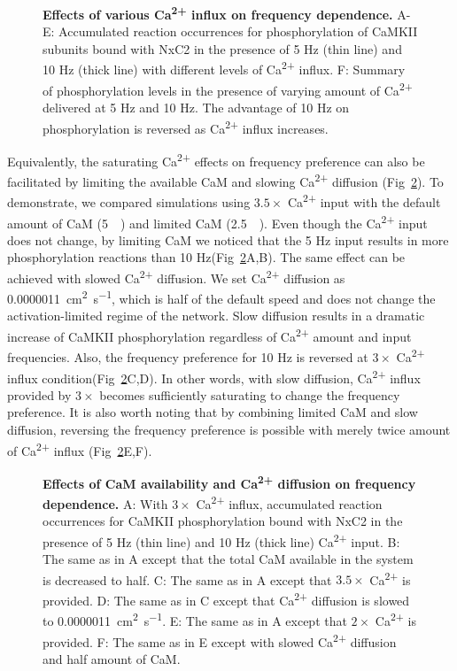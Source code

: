 \documentclass[10pt,letterpaper]{article}
\begin{document}
\begin{figure}[!h]
	\caption{{\bf Effects of various Ca\textsuperscript{2+} influx on frequency dependence.}
	A-E: Accumulated reaction occurrences for phosphorylation of CaMKII subunits bound with NxC2 in the presence of 5 Hz (thin line) and 10 Hz (thick line) with different levels of Ca\textsuperscript{2+} influx. 
	F: Summary of phosphorylation levels in the presence of varying amount of Ca\textsuperscript{2+} delivered at 5 Hz and 10 Hz. The advantage of 10 Hz on phosphorylation is reversed as Ca\textsuperscript{2+} influx increases.
	}
\label{fig9}
\end{figure}

Equivalently, the saturating Ca\textsuperscript{2+} effects on frequency preference can also be facilitated by limiting the available CaM and slowing Ca\textsuperscript{2+} diffusion (Fig~\ref{fig10}). To demonstrate, we compared simulations using $3.5\times$ Ca\textsuperscript{2+} input with the default amount of CaM (\SI{5}{\micro\Molar}) and limited CaM (\SI{2.5}{\micro\Molar}). Even though the Ca\textsuperscript{2+} input does not change, by limiting CaM we noticed that the 5 Hz input results in more phosphorylation reactions than 10 Hz(Fig~\ref{fig10}A,B). The same effect can be achieved with slowed Ca\textsuperscript{2+} diffusion. We set Ca\textsuperscript{2+} diffusion as \SI{0.0000011}{\square\cm\per\s}, which is half of the default speed and does not change the activation-limited regime of the network. Slow diffusion results in a dramatic increase of CaMKII phosphorylation regardless of Ca\textsuperscript{2+} amount and input frequencies. Also, the frequency preference for 10 Hz is reversed at $3\times$ Ca\textsuperscript{2+} influx condition(Fig~\ref{fig10}C,D). In other words, with slow diffusion, Ca\textsuperscript{2+} influx provided by $3\times$ becomes sufficiently saturating to change the frequency preference. It is also worth noting that by combining limited CaM and slow diffusion, reversing the frequency preference is possible with merely twice amount of Ca\textsuperscript{2+} influx (Fig~\ref{fig10}E,F). 

\begin{figure}[!h]
	\caption{{\bf Effects of CaM availability and Ca\textsuperscript{2+} diffusion on frequency dependence.}
	A: With $3\times$ Ca\textsuperscript{2+} influx, accumulated reaction occurrences for CaMKII phosphorylation bound with NxC2 in the presence of 5 Hz (thin line) and 10 Hz (thick line) Ca\textsuperscript{2+} input.
	B: The same as in A except that the total CaM available in the system is decreased to half. 
	C: The same as in A except that $3.5\times$ Ca\textsuperscript{2+} is provided.
	D: The same as in C except that Ca\textsuperscript{2+} diffusion is slowed  to \SI{0.0000011}{\square\cm\per\s}. 
	E: The same as in A except that $2\times$ Ca\textsuperscript{2+} is provided.
	F: The same as in E except with slowed Ca\textsuperscript{2+} diffusion and half amount of CaM.
	}
\label{fig10}
\end{figure}
\end{document}
